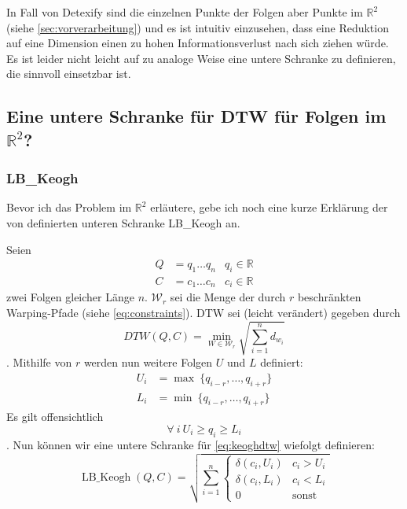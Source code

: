 
In Fall von Detexify sind die einzelnen Punkte der Folgen aber Punkte im \( \mathbb{R}^2 \) (siehe \ref{sec:vorverarbeitung}) und es ist intuitiv einzusehen, dass eine Reduktion auf eine Dimension einen zu hohen Informationsverlust nach sich ziehen würde. Es ist leider nicht leicht auf zu \cite{Keogh:2005p7751} analoge Weise eine untere Schranke zu definieren, die sinnvoll einsetzbar ist.

\subsection{Eine untere Schranke für DTW für Folgen im \( \mathbb{R}^2 \)?}

\subsubsection{LB\_Keogh}
\label{ssub:lb_keogh}

Bevor ich das Problem im \( \mathbb{R}^2 \) erläutere, gebe ich noch eine kurze Erklärung der von \citet{Keogh:2005p7751} definierten unteren Schranke LB\_Keogh an.

Seien
\begin{align}
  Q &= q_1 \dots q_n  & q_i \in \mathbb{R} \\
  C &= c_1 \dots c_n  & c_i \in \mathbb{R}
\end{align}
zwei Folgen gleicher Länge $n$. \( \mathcal{W}_r \) sei die Menge der durch \(r\) beschränkten Warping-Pfade (siehe \ref{eq:constraints}). DTW sei (leicht verändert) gegeben durch
\begin{equation}
  \label{eq:keoghdtw}
  DTW(Q,C) = \min_{W \in \mathcal{W}_r}{\sqrt{\sum_{i=1}^n d_{w_i}}}
\end{equation}.
Mithilfe von \(r\) werden nun weitere Folgen $U$ und $L$ definiert:
\begin{align}
  U_i &= \max ~\{ q_{i-r}, \dots, q_{i+r} \}\\
  L_i &= \min ~\{ q_{i-r}, \dots, q_{i+r} \}
\end{align}
Es gilt offensichtlich
\begin{equation}
  \forall ~ i ~ U_i \geq q_i \geq L_i
\end{equation}.
Nun können wir eine untere Schranke für \ref{eq:keoghdtw} wiefolgt definieren:
\begin{equation}
  \label{eq:lbkeogh}
  \operatorname{LB\_Keogh}(Q,C) = \sqrt{\sum_{i=1}^n
  \begin{cases}
    \delta(c_i, U_i) & c_i > U_i \\
    \delta(c_i, L_i) & c_i < L_i \\
    0 & \text{sonst}
  \end{cases}
  }
\end{equation}

